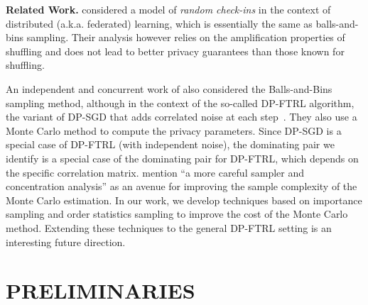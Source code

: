 \documentclass[twoside]{article}
\theoremstyle{definition}
\begin{document}
{\bf Related Work.}
\cite{balle20checkin} considered a model of {\em random check-ins} in the context of distributed (a.k.a. federated) learning, which is essentially the same as balls-and-bins sampling. Their analysis however relies on the amplification properties of shuffling and does not lead to better privacy guarantees than those known for shuffling.

An independent and concurrent work of \cite{choquettechoo24near} also considered the Balls-and-Bins sampling method, although in the context of the so-called DP-FTRL algorithm, the variant of DP-SGD that adds correlated noise at each step~\citep{kairouz21practical,mcmahan22dpmf}. They also use a Monte Carlo method to compute the privacy parameters.
Since DP-SGD is a special case of DP-FTRL (with independent noise), the dominating pair we identify is a special case of the dominating pair for DP-FTRL, which depends on the specific correlation matrix. \cite{choquettechoo24near} mention ``a more careful sampler and concentration analysis'' as an avenue for improving the sample complexity of the Monte Carlo estimation. In our work, we develop techniques based on importance sampling and order statistics sampling to improve the cost of the Monte Carlo method.  Extending these techniques to the  general DP-FTRL setting is an interesting future direction.

\section{PRELIMINARIES}\label{sec:prelims}
\vspace{-2mm}
\end{document}
